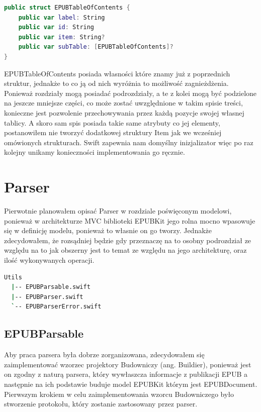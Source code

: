 \begin{lstlisting}[caption={Struktura EPUBTableOfContents.}, language=swift]
public struct EPUBTableOfContents {
    public var label: String
    public var id: String
    public var item: String?
    public var subTable: [EPUBTableOfContents]?
}
\end{lstlisting}

EPUBTableOfContents posiada własności które znamy już z poprzednich struktur, jednakże to co ją od nich wyróżnia to możliwość zagnieżdżenia. Ponieważ rozdziały mogą posiadać podrozdziały, a te z kolei mogą być podzielone na jeszcze mniejsze części, co może zostać uwzględnione w takim spisie treści, konieczne jest pozwolenie przechowywania przez każdą pozycje swojej własnej tablicy. A skoro sam spis posiada takie same atrybuty co jej elementy, postanowiłem nie tworzyć dodatkowej struktury Item jak we wcześniej omówionych strukturach. Swift zapewnia nam domyślny inizjalizator więc po raz kolejny unikamy konieczności implementowania go ręcznie.

\section{Parser}

Pierwotnie planowałem opisać Parser w rozdziale poświęconym modelowi, ponieważ w architekturze MVC biblioteki EPUBKit jego rolna mocno wpasowuje się w definicję modelu, ponieważ to własnie on go tworzy. Jednakże zdecydowałem, że rozsądniej będzie gdy przeznaczę na to osobny podrozdział ze względu na to jak obszerny jest to temat ze względu na jego architekturę, oraz ilość wykonywanych operacji.

\begin{lstlisting}[caption={Struktura folderu narzędzi służących modelowi EPUBKit.}, language=bash]
  Utils
  |-- EPUBParsable.swift
  |-- EPUBParser.swift
  `-- EPUBParserError.swift
\end{lstlisting}

\subsection{EPUBParsable}

Aby praca parsera była dobrze zorganizowana, zdecydowałem się zaimplementować wzorzec projektory Budowniczy (ang. Buildier), ponieważ jest on zgodny z naturą parsera, który wywłaszcza informacje z publikacji EPUB a następnie na ich podstawie buduje model EPUBKit którym jest EPUBDocument. Pierwszym krokiem w celu zaimplementowania wzorcu Budowniczego było stworzenie protokołu, który zostanie zastosowany przez parser.

